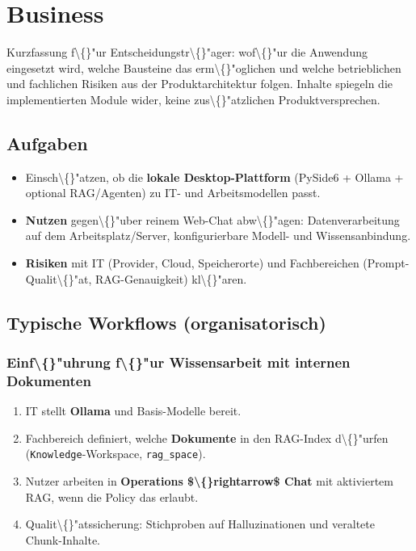 \section{Business}

Kurzfassung f\textbackslash\{\}"ur Entscheidungstr\textbackslash\{\}"ager: wof\textbackslash\{\}"ur die Anwendung eingesetzt wird, welche Bausteine das erm\textbackslash\{\}"oglichen und welche betrieblichen und fachlichen Risiken aus der Produktarchitektur folgen. Inhalte spiegeln die implementierten Module wider, keine zus\textbackslash\{\}"atzlichen Produktversprechen.

\subsection{Aufgaben}

\begin{itemize}
\item Einsch\textbackslash\{\}"atzen, ob die \textbf{lokale Desktop-Plattform} (PySide6 + Ollama + optional RAG/Agenten) zu IT- und Arbeitsmodellen passt.
\item \textbf{Nutzen} gegen\textbackslash\{\}"uber reinem Web-Chat abw\textbackslash\{\}"agen: Datenverarbeitung auf dem Arbeitsplatz/Server, konfigurierbare Modell- und Wissensanbindung.
\item \textbf{Risiken} mit IT (Provider, Cloud, Speicherorte) und Fachbereichen (Prompt-Qualit\textbackslash\{\}"at, RAG-Genauigkeit) kl\textbackslash\{\}"aren.
\end{itemize}

\subsection{Typische Workflows (organisatorisch)}

\subsubsection{Einf\textbackslash\{\}"uhrung f\textbackslash\{\}"ur Wissensarbeit mit internen Dokumenten}

\begin{enumerate}
\item IT stellt \textbf{Ollama} und Basis-Modelle bereit.
\item Fachbereich definiert, welche \textbf{Dokumente} in den RAG-Index d\textbackslash\{\}"urfen (\texttt{Knowledge}-Workspace, \texttt{rag\_space}).
\item Nutzer arbeiten in \textbf{Operations \$\textbackslash\{\}rightarrow\$ Chat} mit aktiviertem RAG, wenn die Policy das erlaubt.
\item Qualit\textbackslash\{\}"atssicherung: Stichproben auf Halluzinationen und veraltete Chunk-Inhalte.
\end{enumerate}

